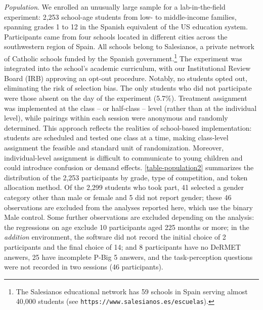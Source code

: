 \documentclass[11pt]{article}
\begin{document}
  
\emph{Population}.
We enrolled an unusually large sample for a lab-in-the-field experiment: 2,253 school-age students from low- to middle-income families, spanning grades 1 to 12 in the Spanish equivalent of the US education system. Participants came from four schools located in different cities across the southwestern region of Spain. All schools belong to Salesianos, a private network of Catholic schools funded by the Spanish government.\footnote{The Salesianos educational network has 59 schools in Spain serving almost 40,000 students (see {\tt https://www.salesianos.es/escuelas}).} 
The experiment was integrated into the school’s academic curriculum, with our Institutional Review Board (IRB) approving an opt-out procedure. Notably, no students opted out, eliminating the risk of selection bias. The only students who did not participate were those absent on the day of the experiment (5.7\%). Treatment assignment was implemented at the class -- or half-class -- level (rather than at the individual level), while pairings within each session were anonymous and randomly determined. This approach reflects the realities of school-based implementation: students are scheduled and tested one class at a time, making class-level assignment the feasible and standard unit of randomization. Moreover, individual-level assignment is difficult to communicate to young children and could introduce confusion or demand effects.
\autoref{table-population2} summarizes the distribution of the 2,253 participants by grade, type of competition, and token allocation method. Of the 2,299 students who took part, 41 selected a gender category other than male or female and 5 did not report gender; these 46 observations are excluded from the analyses reported here, which use the binary Male control. Some further observations are excluded depending on the analysis: the regressions on age exclude 10 participants aged 225 months or more; in the \emph{addition} environment, the software did not record the initial choice of 2 participants and the final choice of 14; and 8 participants have no DeRMET answers, 25 have incomplete P-Big 5 answers, and the task-perception questions were not recorded in two sessions (46 participants).
\end{document}
